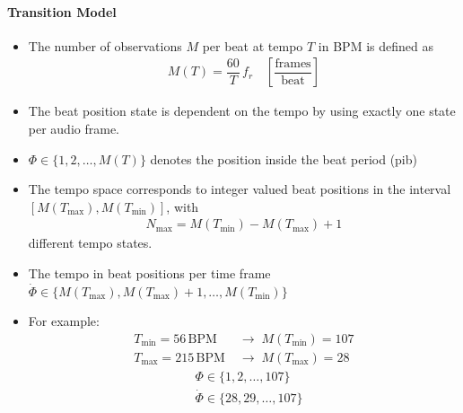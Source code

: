 \documentclass{scrartcl}
\begin{document}
\paragraph{Transition Model}
\begin{itemize}
\item The number of observations $M$ per beat at tempo $T$ in BPM is defined as 
\begin{align}
M(T) = \dfrac{60}{T} \,f_r \quad \left[ \dfrac{\text{frames}}{\text{beat}}\right]
\end{align} 
\item The beat position state is dependent on the tempo by using exactly one  state per audio frame.


\item $\Phi \in \{1,2,\dots, M(T)\}$ denotes the position inside the beat period (pib)
\item The tempo space corresponds to integer valued beat positions in the interval $[M(T_{\text{max}}), M(T_{\text{min}})]$, with 
\begin{align}
N_{\text{max}} = M(T_{\text{min}}) - M(T_{\text{max}}) + 1
\end{align} 
different tempo states.

\item The tempo in beat positions per time frame $\dot \Phi \in \{M(T_{\text{max}}), M(T_{\text{max}}) + 1,  \dots, M(T_{\text{min}})\}$ 
\item For example: 
\begin{align*}
T_{\text{min}} = 56 \,\text{BPM} & \;\rightarrow \; M(T_{\text{min}}) = 107 \\
T_{\text{max}} = 215 \,\text{BPM} &\;\rightarrow \; M(T_{\text{max}}) = 28 
\end{align*} 
\vspace{-1.5em}
\begin{align*}
&\Phi \in \{1, 2, \dots ,107\} \\
&\dot \Phi \in \{28, 29, \dots ,107\}
\end{align*} 



\end{itemize}
\end{document}
